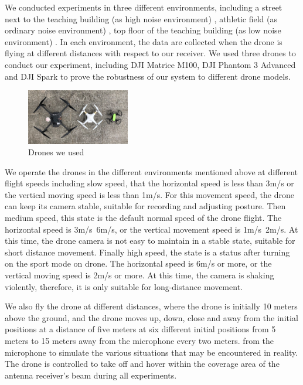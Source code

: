 \documentclass{sig-alternate-10pt}
\begin{document}
We conducted experiments in three different environments, including a street next to the teaching building (as high noise environment) , athletic field (as ordinary noise environment) , top floor of the teaching building (as low noise environment) . In each environment, the data are collected when the drone is flying at different distances with respect to our receiver. We used three drones to conduct our experiment, including DJI Matrice M100, DJI Phantom 3 Advanced and DJI Spark to prove the robustness of our system to different drone models. 



\begin{figure}[!h]

	\centering
	\includegraphics[width=0.4\textwidth]{pics/drones.png}
	\caption{Drones we used}
	\label{drones}
\end{figure}


\hspace{1mm} 
We operate the drones in the different environments mentioned above at different flight speeds including slow speed, that the horizontal speed is less than 3m/s or the vertical moving speed is less than 1m/s. For this movement speed, the drone can keep its camera stable, suitable for recording and adjusting posture. Then medium speed, this state is the default normal speed of the drone flight. The horizontal speed is 3m/s~6m/s, or the vertical movement speed is 1m/s~2m/s. At this time, the drone camera is not easy to maintain in a stable state, suitable for short distance movement. Finally high speed, the state is a status after turning on the sport mode on drone. The horizontal speed is 6m/s or more, or the vertical moving speed is 2m/s or more. At this time, the camera is shaking violently, therefore, it is only suitable for long-distance movement.

\hspace{1mm} 
We also fly the drone at different distances, where the drone is initially 10 meters above the ground, and the drone moves up, down, close and away from the initial positions at a distance of five meters at six different initial positions from 5 meters to 15 meters away from the microphone every two meters. from the microphone to simulate the various situations that may be encountered in reality. The drone is controlled to take off and hover within the coverage area of the antenna receiver’s beam during all experiments.
\end{document}
